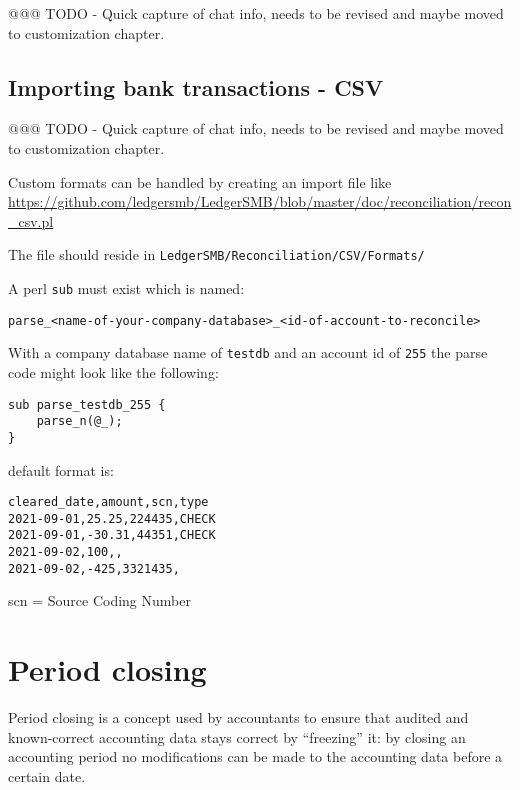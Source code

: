 @@@ TODO - Quick capture of chat info, needs to be revised and maybe moved to customization chapter.

\subsection{Importing bank transactions - CSV}
\label{subsec-importing-bank-transactions-csv}


@@@ TODO - Quick capture of chat info, needs to be revised and maybe moved to customization chapter.

Custom formats can be handled by creating an import file
like \url{https://github.com/ledgersmb/LedgerSMB/blob/master/doc/reconciliation/recon_csv.pl}

The file should reside in \texttt{LedgerSMB/Reconciliation/CSV/Formats/}

A perl \texttt{sub} must exist which is named:

\begin{verbatim}
parse_<name-of-your-company-database>_<id-of-account-to-reconcile>
\end{verbatim}

With a company database name of \texttt{testdb} and an account id of \texttt{255} the parse code might look like the following:

\begin{verbatim}
sub parse_testdb_255 {
    parse_n(@_);
}
\end{verbatim}

default format is:
\begin{verbatim}
cleared_date,amount,scn,type
2021-09-01,25.25,224435,CHECK
2021-09-01,-30.31,44351,CHECK
2021-09-02,100,,
2021-09-02,-425,3321435,
\end{verbatim}

scn = Source Coding Number

\section{Period closing}
\label{sec-business-processes-accounting-period-closing}

Period closing is a concept used by accountants to ensure that audited and
known-correct accounting data stays correct by ``freezing'' it: by closing
an accounting period no modifications can be made to the accounting data
before a certain date.

